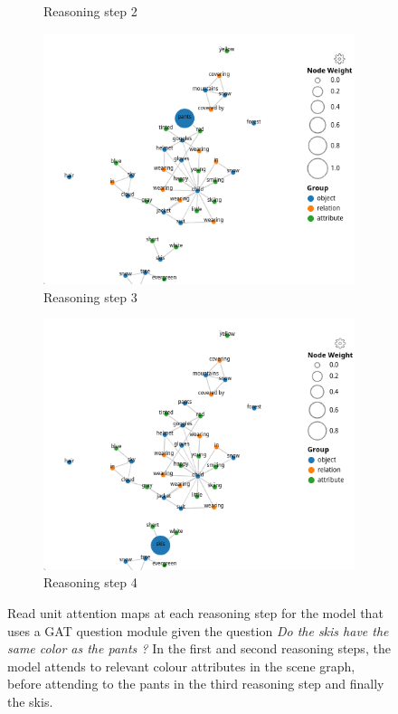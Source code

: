 \begin{figure}[htbp]
\begin{subfigure}[r]{0.4\textwidth}
        \caption{Reasoning step 2}
    \end{subfigure}
    \begin{subfigure}[l]{0.4\textwidth}
        \includegraphics[width=\textwidth]{figures/qav/qav_gat_r2.png}
        \caption{Reasoning step 3}
    \end{subfigure}
    \begin{subfigure}[r]{0.4\textwidth}
        \includegraphics[width=\textwidth]{figures/qav/qav_gat_r3.png}
        \caption{Reasoning step 4}
    \end{subfigure}
    \caption[A collection of GAT question module read unit attemtion maps]{Read unit attention maps at each reasoning step for the model that uses a GAT question module given the question \textit{Do the skis have the same color as the pants ?} In the first and second reasoning steps, the model attends to relevant colour attributes in the scene graph, before attending to the pants in the third reasoning step and finally the skis.}
    \label{fig:gat_read_attention_maps}
\end{figure}
